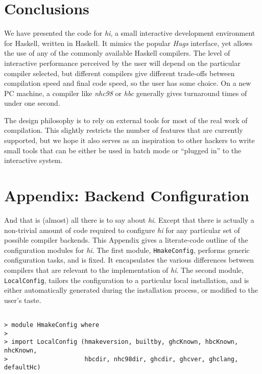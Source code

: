 \documentclass[a4paper]{article}
\begin{document}
\section{Conclusions}

We have presented the code for {\em hi}, a small interactive
development environment for Haskell, written in Haskell.  It mimics the
popular {\em Hugs} interface, yet allows the use of any of the commonly
available Haskell compilers.  The level of interactive performance
perceived by the user will depend on the particular compiler selected,
but different compilers give different trade-offs between compilation
speed and final code speed, so the user has some choice.  On a new
PC machine, a compiler like {\em nhc98} or {\em hbc} generally gives
turnaround times of under one second.

The design philosophy is to rely on external tools for most of the
real work of compilation.  This slightly restricts the number of
features that are currently supported, but we hope it also serves
as an inspiration to other hackers to write small tools that can
be either be used in batch mode or ``plugged in'' to the interactive
system.


\section*{Appendix: Backend Configuration}

And that is (almost) all there is to say about {\em hi}.  Except that
there is actually a non-trivial amount of code required to configure
{\em hi} for any particular set of possible compiler backends.
This Appendix gives a literate-code outline of the configuration
modules for {\em hi}.  The first module, {\tt HmakeConfig}, performs
generic configuration tasks, and is fixed.  It encapsulates the various
differences between compilers that are relevant to the implementation
of {\em hi}.  The second module, {\tt LocalConfig}, tailors the
configuration to a particular local installation, and is either
automatically generated during the installation process, or modified
to the user's taste.

\begin{verbatim}

> module HmakeConfig where
> 
> import LocalConfig (hmakeversion, builtby, ghcKnown, hbcKnown, nhcKnown,
>                     hbcdir, nhc98dir, ghcdir, ghcver, ghclang, defaultHc)

\end{verbatim}
\end{document}
